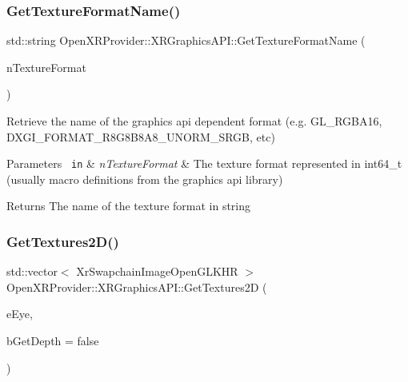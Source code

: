 \subsubsection{\texorpdfstring{GetTextureFormatName()}{GetTextureFormatName()}}
{\footnotesize\ttfamily std\+::string Open\+X\+R\+Provider\+::\+X\+R\+Graphics\+A\+P\+I\+::\+Get\+Texture\+Format\+Name (\begin{DoxyParamCaption}\item[{int64\+\_\+t}]{n\+Texture\+Format }\end{DoxyParamCaption})}

Retrieve the name of the graphics api dependent format (e.\+g. G\+L\+\_\+\+R\+G\+B\+A16, D\+X\+G\+I\+\_\+\+F\+O\+R\+M\+A\+T\+\_\+\+R8\+G8\+B8\+A8\+\_\+\+U\+N\+O\+R\+M\+\_\+\+S\+R\+GB, etc) 
\begin{DoxyParams}[1]{Parameters}
\mbox{\texttt{ in}}  & {\em n\+Texture\+Format} & The texture format represented in int64\+\_\+t (usually macro definitions from the graphics api library) \\
\hline
\end{DoxyParams}
\begin{DoxyReturn}{Returns}
The name of the texture format in string 
\end{DoxyReturn}
\mbox{\label{class_open_x_r_provider_1_1_x_r_graphics_a_p_i_ae3cfae0f48a2095420b3f0e3319ab2a1}} 
\subsubsection{\texorpdfstring{GetTextures2D()}{GetTextures2D()}}
{\footnotesize\ttfamily std\+::vector$<$ Xr\+Swapchain\+Image\+Open\+G\+L\+K\+HR $>$ Open\+X\+R\+Provider\+::\+X\+R\+Graphics\+A\+P\+I\+::\+Get\+Textures2D (\begin{DoxyParamCaption}\item[{const \mbox{\hyperlink{namespace_open_x_r_provider_a8aa379869e30772896e6c468eb54f155}{E\+X\+R\+Eye}}}]{e\+Eye,  }\item[{const bool}]{b\+Get\+Depth = {\ttfamily false} }\end{DoxyParamCaption})}

